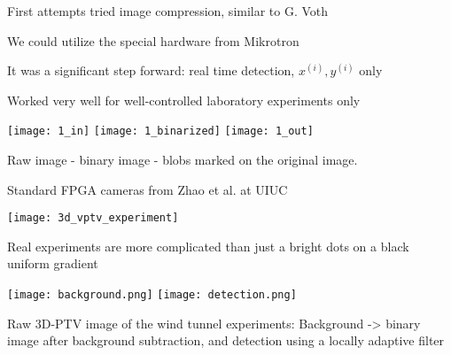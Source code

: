 \begin{frame}[label=real-5a]{First attempts tried image compression, similar to G. Voth}
    \centering{}
\end{frame}


\begin{frame}[label=real-5b]{We could utilize the special hardware from Mikrotron }
    \begin{multicols*}{2}
    \end{multicols*}
    \centering {}
\end{frame}


\begin{frame}[label=real-6]{It was a significant step forward: real time detection, $x^{(i)},y^{(i)}$ only}
    \centering{}
\end{frame}


\begin{frame}[label=real-7]{Worked very well for well-controlled laboratory experiments only}
    \begin{card}
    \centering
    \texttt{[image: 1\_in]}
    \texttt{[image: 1\_binarized]}
    \texttt{[image: 1\_out]}
    \end{card}
    \vspace{-.5cm}
    \begin{cardTiny}
    Raw image - binary image - blobs marked on the original image.  
    \end{cardTiny}
\end{frame}


\begin{frame}[label=real-7c]{Standard FPGA cameras from Zhao et al. at UIUC}
    \begin{card}
    \centering
    \texttt{[image: 3d\_vptv\_experiment]}
    \end{card}
\end{frame}


\begin{frame}[label=real-8]{Real experiments are more complicated than just a bright dots on a black uniform gradient}
    \begin{multicols}{2}
    \texttt{[image: background.png]}
    \texttt{[image: detection.png]}
    \end{multicols}
    \begin{cardTiny}
    Raw 3D-PTV image of the wind tunnel experiments: Background ->  binary image after background subtraction, and detection using a locally adaptive filter
    \end{cardTiny}
\end{frame}


